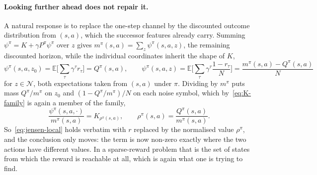 \documentclass[11pt]{article}
\theoremstyle{remark}
\newcommand{\Ncal}{\mathcal N}
\newcommand{\E}{\mathbb E}
\newcommand{\1}{\mathds{1}}
\begin{document}
\paragraph{Looking further ahead does not repair it.}
A natural response is to replace the one-step channel by the discounted outcome distribution from $(s,a)$, which the successor features already carry.
Summing $\psi^\pi=K+\gamma P^\pi\psi^\pi$ over $z$ gives $m^\pi(s,a)=\sum_z\psi^\pi(s,a,z)$, the remaining discounted horizon, while the individual coordinates inherit the shape of $K$,
\begin{equation}
  \psi^\pi(s,a,z_0)=\E\Big[\sum_\tau\gamma^\tau r_\tau\Big]=Q^\pi(s,a),
  \qquad
  \psi^\pi(s,a,z)=\E\Big[\sum_\tau\gamma^\tau\frac{1-r_\tau}{N}\Big]=\frac{m^\pi(s,a)-Q^\pi(s,a)}{N}
\end{equation}
for $z\in\Ncal$, both expectations taken from $(s,a)$ under $\pi$.
Dividing by $m^\pi$ puts mass $Q^\pi/m^\pi$ on $z_0$ and $(1-Q^\pi/m^\pi)/N$ on each noise symbol, which by~\eqref{eq:K-family} is again a member of the family,
\begin{equation}
  \frac{\psi^\pi(s,a,\cdot)}{m^\pi(s,a)}=K_{\rho^\pi(s,a)},
  \qquad
  \rho^\pi(s,a)=\frac{Q^\pi(s,a)}{m^\pi(s,a)} .
  \label{eq:psi-normalised}
\end{equation}
So~\eqref{eq:jensen-local} holds verbatim with $r$ replaced by the normalised value $\rho^\pi$, and the conclusion only moves: the term is now non-zero exactly where the two actions have different values.
In a sparse-reward problem that is the set of states from which the reward is reachable at all, which is again what one is trying to find.
\end{document}
